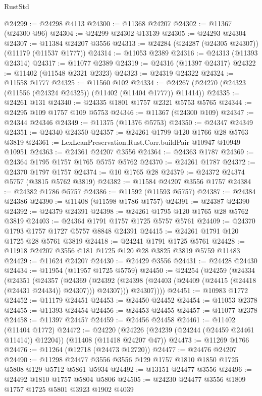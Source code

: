 \begin{lexlean}{RustStd}
\begin{coremodule}
@24299 := @24298 @4113
@24300 := @11368 @24207
@24302 := @11367 (@24300 @96)
@24304 := @24299 @24302 @13139
@24305 := @24293 @24304
@24307 := @11384 @24207 @3556
@24313 := @24284 (@24287 (@24305 @24307)) (@11179 (@11537 @1777))
@24314 := @11053 @2389
@24316 := @24313 (@11393 @24314)
@24317 := @11077 @2389
@24319 := @24316 (@11397 @24317)
@24322 := @11402 (@11548 @2321 @2323)
@24323 := @24319 @24322
@24324 := @11558 @1777
@24325 := @11560 @102
@24334 := @24267 (@24270 (@24323 (@11556 (@24324 @24325)) (@11402 (@11404 @1777)) @11414))
@24335 := @24261 @131
@24340 := @24335 @1801 @1757 @2321 @5753 @5765
@24344 := @24295 @109 @1757 @109 @5753
@24346 := @11367 (@24300 @109)
@24347 := @24344 @24346
@24349 := @11375 (@11376 @5753)
@24350 := @24347 @24349
@24351 := @24340 @24350
@24357 := @24261 @1799 @120 @1766 @28 @5763 @3819
@24361 := LexLeanPreservation.Rust.Corr.buildPair @10947 @10949 @10951
@24363 := @24361 @24207 @3556
@24364 := @24363 @1787
@24369 := @24364 @1795 @1757 @1765 @5757 @5762
@24370 := @24261 @1787
@24372 := @24370 @1797 @1757
@24374 := @10 @1765 @28
@24379 := @24372 @24374 @5757 (@3815 @5762 @3819)
@24382 := @11584 @24207 @3556 @1757
@24384 := @24382 @1786 @5757
@24386 := @11592 (@11593 @5757)
@24387 := @24384 @24386
@24390 := @11408 (@11598 @1786 @1757)
@24391 := @24387 @24390
@24392 := @24379 @24391
@24398 := @24261 @1795 @120 @1765 @28 @5762 @3819
@24403 := @24364 @1791 @1757 @1725 @5757 @5761
@24409 := @24370 @1793 @1757 @1727 @5757 @8848 @24391
@24415 := @24261 @1791 @120 @1725 @28 @5761 @3819
@24418 := @24241 @1791 @1725 @5761
@24428 := @11918 @24207 @3556 @181 @1725 @120 @28 @3825 @3819 @5759 @11483
@24429 := @11624 @24207
@24430 := @24429 @3556
@24431 := @24428 @24430
@24434 := @11954 (@11957 @1725 @5759)
@24450 := @24254
    (@24259
      (@24334
        (@24351
          (@24357
            (@24369
              (@24392 (@24398 (@24403 (@24409 (@24415 (@24418 (@24431 @24434)) @24307))) @24307)))
            @24307))))
@24451 := @10983 @1772
@24452 := @11179 @24451
@24453 := @24450 @24452
@24454 := @11053 @2378
@24455 := @11393 @24454
@24456 := @24453 @24455
@24457 := @11077 @2378
@24458 := @11397 @24457
@24459 := @24456 @24458
@24461 := @11402 (@11404 @1772)
@24472 := @24220
    (@24226 (@24239 (@24244 (@24459 @24461 @11414)) @12204))
    (@11408 (@11418 @24207 @47))
@24473 := @11269 @1766
@24476 := @11264 (@12718 (@24473 @12720))
@24477 := @24476 @24207
@24490 := @11298 @24477 @3556 @3556 @129 @1757 @1810 @1850 @1725 @5808 @129 @5712 @5861 @5934
@24492 := @13151 @24477 @3556
@24496 := @24492 @1810 @1757 @5804 @5806
@24505 := @24230 @24477 @3556 @1809 @1757 @1725 @5801 @3923 @1902 @4039

\end{coremodule}
\end{lexlean}
